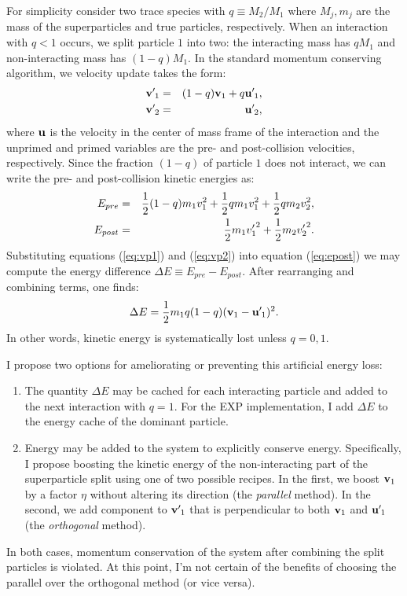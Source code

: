 \documentclass[12pt]{article}
\newcommand*{\myprime}{^{\prime}\mkern-1.2mu}
\newcommand{\bv}{{\bf v}}
\newcommand{\bu}{{\bf u}}
\newcommand{\bvp}{{\bf v}\myprime}
\newcommand{\bup}{{\bf u}\myprime}
\begin{document}
For simplicity consider two trace species with $q\equiv M_2/M_1$ where
$M_j, m_j$ are the mass of the superparticles and true particles,
respectively.  When an interaction with $q<1$ occurs, we split
particle $1$ into two: the interacting mass has $qM_1$ and
non-interacting mass has $(1-q)M_1$.  In the standard momentum
conserving algorithm, we velocity update takes the form:
\begin{eqnarray}
\bvp_1 &=& (1-q)\bv_1 + q\bup_1, \label{eq:vp1}\\
\bvp_2 &=& \bup_2, \label{eq:vp2}
\end{eqnarray}
where $\bu$ is the velocity in the center of mass frame of the
interaction and the unprimed and primed variables are the pre- and
post-collision velocities, respectively.  Since the fraction $(1-q)$
of particle $1$ does not interact, we can write the pre- and
post-collision kinetic energies as:
\begin{eqnarray}
E_{pre} &=& \frac12(1-q)m_1v_1^2 + \frac12qm_1v_1^2 +
\frac12qm_2v_2^2, \label{eq:epre}\\ E_{post} &=&
\frac12m_1{v_1\myprime}^2 +
\frac12m_2{v_2\myprime}^2. \label{eq:epost}
\end{eqnarray}
Substituting equations (\ref{eq:vp1}) and (\ref{eq:vp2}) into equation
(\ref{eq:epost}) we may compute the energy difference $\Delta E\equiv
E_{pre} - E_{post}$.  After rearranging and combining terms, one
finds:
\begin{equation}
  \Delta E = \frac12m_1q(1-q)(\bv_1 - \bup_1)^2.
\end{equation}
In other words, kinetic energy is systematically lost unless $q=0, 1$.

I propose two options for ameliorating or preventing this artificial
energy loss:
\begin{enumerate}
\item The quantity $\Delta E$ may be cached for each interacting
  particle and added to the next interaction with $q=1$.  For the EXP
  implementation, I add $\Delta E$ to the energy cache of the dominant
  particle.
\item Energy may be added to the system to explicitly conserve energy.
  Specifically, I propose boosting the kinetic energy of the
  non-interacting part of the superparticle split using one of two
  possible recipes.  In the first, we boost $\bv_1$ by a factor $\eta$
  without altering its direction (the \emph{parallel} method).  In the
  second, we add component to $\bvp_1$ that is perpendicular to both
  $\bv_1$ and $\bup_1$ (the \emph{orthogonal} method).
\end{enumerate}
In both cases, momentum conservation of the system after combining the
split particles is violated.  At this point, I'm not certain of the
benefits of choosing the parallel over the orthogonal method (or vice
versa).
\end{document}
